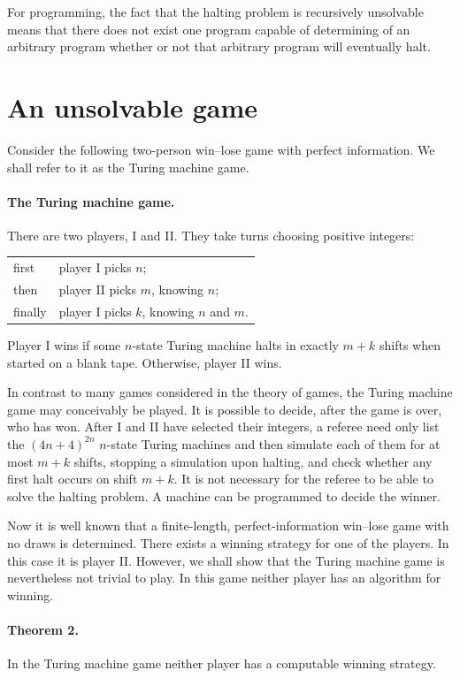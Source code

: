 \documentclass[11pt]{article}
\newcommand{\origpage}[1]{\marginnote{\footnotesize\textbf{[#1]}}}
\begin{document}
For programming, the fact that the halting problem is recursively unsolvable means that there does not exist one program capable of determining of an arbitrary program whether or not that arbitrary program will eventually halt.
\section{An unsolvable game} Consider the following two-person win--lose game with perfect information. We shall refer to it as the Turing machine game.

\paragraph{The Turing machine game.} \origpage{735}There are two players, I and II. They take turns choosing positive integers:

\begin{center}
\begin{tabular}{@{}ll@{}}
first & player I picks $n$; \\
then & player II picks $m$, knowing $n$; \\
finally & player I picks $k$, knowing $n$ and $m$.
\end{tabular}
\end{center}

Player I wins if some $n$-state Turing machine halts in exactly $m+k$ shifts when started on a blank tape. Otherwise, player II wins.

In contrast to many games considered in the theory of games, the Turing machine game may conceivably be played. It is possible to decide, after the game is over, who has won. After I and II have selected their integers, a referee need only list the $(4n+4)^{2n}$ $n$-state Turing machines and then simulate each of them for at most $m+k$ shifts, stopping a simulation upon halting, and check whether any first halt occurs on shift $m+k$. It is not necessary for the referee to be able to solve the halting problem. A machine can be programmed to decide the winner.

Now it is well known that a finite-length, perfect-information win--lose game with no draws is determined. There exists a winning strategy for one of the players. In this case it is player II. However, we shall show that the Turing machine game is nevertheless not trivial to play. In this game neither player has an algorithm for winning.

\paragraph{Theorem 2.} In the Turing machine game neither player has a computable winning strategy.
\end{document}
